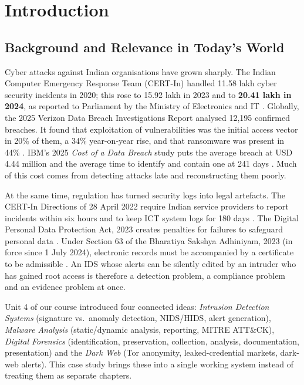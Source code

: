 \documentclass[12pt,a4paper,oneside]{article}
\begin{document}
\section{Introduction}
\subsection{Background and Relevance in Today's World}
Cyber attacks against Indian organisations have grown sharply. The Indian Computer Emergency Response Team (CERT-In) handled 11.58 lakh cyber security incidents in 2020; this rose to 15.92 lakh in 2023 and to \textbf{20.41 lakh in 2024}, as reported to Parliament by the Ministry of Electronics and IT \cite{certin2025rs}. Globally, the 2025 Verizon Data Breach Investigations Report analysed 12{,}195 confirmed breaches. It found that exploitation of vulnerabilities was the initial access vector in 20\% of them, a 34\% year-on-year rise, and that ransomware was present in 44\% \cite{verizon2025}. IBM's 2025 \emph{Cost of a Data Breach} study puts the average breach at USD 4.44 million and the average time to identify and contain one at 241 days \cite{ibm2025}. Much of this cost comes from detecting attacks late and reconstructing them poorly.

At the same time, regulation has turned security logs into legal artefacts. The CERT-In Directions of 28 April 2022 require Indian service providers to report incidents within six hours and to keep ICT system logs for 180 days \cite{certin2022}. The Digital Personal Data Protection Act, 2023 creates penalties for failures to safeguard personal data \cite{dpdp2023}. Under Section 63 of the Bharatiya Sakshya Adhiniyam, 2023 (in force since 1 July 2024), electronic records must be accompanied by a certificate to be admissible \cite{bsa2023}. An IDS whose alerts can be silently edited by an intruder who has gained root access is therefore a detection problem, a compliance problem and an evidence problem at once.

Unit 4 of our course introduced four connected ideas: \emph{Intrusion Detection Systems} (signature vs.\ anomaly detection, NIDS/HIDS, alert generation), \emph{Malware Analysis} (static/dynamic analysis, reporting, MITRE ATT\&CK), \emph{Digital Forensics} (identification, preservation, collection, analysis, documentation, presentation) and the \emph{Dark Web} (Tor anonymity, leaked-credential markets, dark-web alerts). This case study brings these into a single working system instead of treating them as separate chapters.
\end{document}
